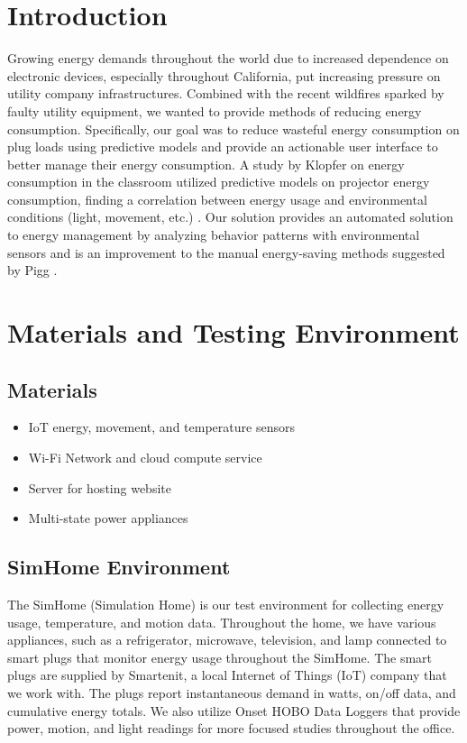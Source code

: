 \documentclass[conference]{IEEEtran}
\begin{document}


\section{Introduction}
Growing energy demands throughout the world due to increased dependence on electronic devices, especially throughout California, put increasing pressure on utility company infrastructures. Combined with the recent wildfires sparked by faulty utility equipment, we wanted to provide methods of reducing energy consumption. Specifically, our goal was to reduce wasteful energy consumption on plug loads using predictive models and provide an actionable user interface to better manage their energy consumption. A study by Klopfer on energy consumption in the classroom utilized predictive models on projector energy consumption, finding a correlation between energy usage and environmental conditions (light, movement, etc.) \cite{b3}. Our solution provides an automated solution to energy management by analyzing behavior patterns with environmental sensors and is an improvement to the manual energy-saving methods suggested by Pigg \cite{b2}.

\section{Materials and Testing Environment}
\subsection{Materials}
\begin{itemize}
    \item IoT energy, movement, and temperature sensors
    \item Wi-Fi Network and cloud compute service
    \item Server for hosting website
    \item Multi-state power appliances
\end{itemize}

\subsection{SimHome Environment}
The SimHome (Simulation Home) is our test environment for collecting energy usage, temperature, and motion data. Throughout the home, we have various appliances, such as a refrigerator, microwave, television, and lamp connected to smart plugs that monitor energy usage throughout the SimHome. The smart plugs are supplied by Smartenit, a local Internet of Things (IoT) company that we work with. The plugs report instantaneous demand in watts, on/off data, and cumulative energy totals. We also utilize Onset HOBO Data Loggers that provide power, motion, and light readings for more focused studies throughout the office.
\end{document}
